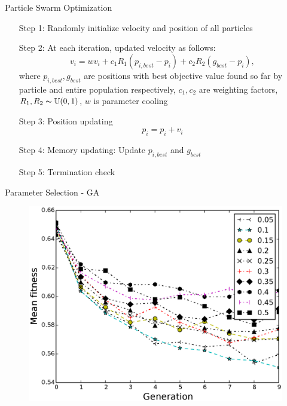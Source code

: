 \documentclass{beamer}
\begin{document}
\begin{frame}{Particle Swarm Optimization}
    \begin{enumerate}
        \item [Step 1:] Randomly initialize velocity and position of all particles
        \item [Step 2:] At each iteration, updated velocity as follows:
            \[ v_i = wv_i + c_1 R_1 (p_{i,best} - p_i) + c_2 R_2 (g_{best} - p_i) ,\]
            where $p_{i,best}, g_{best}$ are positions with best objective value found so far by particle and entire population respectively, $c_1,c_2$ are weighting factors, $R_1,R_2 \thicksim \mathbb U(0,1)$, $w$ is parameter cooling
        \item [Step 3:] Position updating
            \[ p_i = p_i + v_i \]
        \item [Step 4:] Memory updating: Update $p_{i,best}$ and $g_{best}$
        \item [Step 5:] Termination check
    \end{enumerate}
\end{frame}


\begin{frame}{Parameter Selection - GA}
 \begin{figure}
\centering
\vspace*{-0.4cm}
    \includegraphics[scale=0.48]{../paper/FIG/ga_mut}%
\end{figure}
\end{frame}
\end{document}

